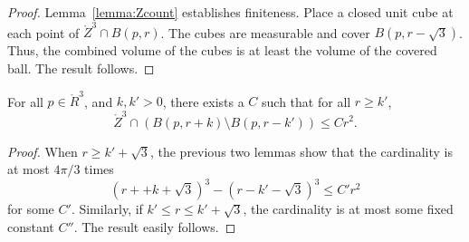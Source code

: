 \begin{proof}  Lemma~\ref{lemma:Zcount} establishes finiteness.  Place a closed unit cube at each point
of $\ring{Z}^3\cap B(p,r)$.  The cubes are measurable and cover
$B(p,r-\sqrt3)$.  Thus, the combined volume of the cubes is at
least the volume of the covered ball.  The result follows.
\end{proof}

\begin{lemma}
For all $p\in\ring{R}^3$, and $k,k'>0$, there exists a $C$ such
that for all $r\ge k'$, 
    $$
    \ring{Z}^3 \cap (B(p,r+k) \setminus B(p,r-k')) \le C r^2.
    $$
\end{lemma}

\begin{proof}  When $r \ge k'+\sqrt3$, the previous two lemmas show
that the cardinality is at most $4\pi/3$ times
    $$(r + +k + \sqrt3)^3 - (r - k' - \sqrt3)^3 \le C' r^2$$
for some $C'$.  Similarly, if $k'\le r\le k'+\sqrt3$, the
cardinality is at most some fixed constant $C''$.  The result
easily follows.
\end{proof}

